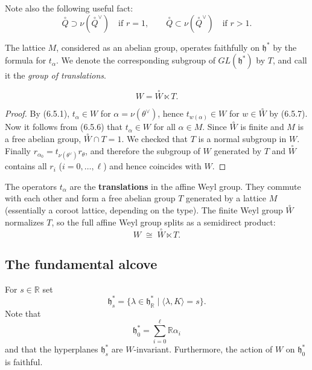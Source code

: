 \documentclass[12pt]{article}
\begin{document}
Note also the following useful fact:
\begin{equation} \label{6.5.9}
    \overset{\circ}{Q} \supset \nu(\overset{\circ}{Q}^\vee) \quad \text{if $r=1$},
    \qquad 
    \overset{\circ}{Q} \subset \nu(\overset{\circ}{Q}^\vee) \quad \text{if $r>1$}.
\end{equation}

The lattice $M$, considered as an abelian group, operates faithfully on $\mathfrak{h}^*$ by the formula for $t_\alpha$. We denote the corresponding subgroup of $GL(\mathfrak{h}^*)$ by $T$, and call it the \emph{group of translations}.

\begin{proposition}[6.5]
\[
    W = \overset{\circ}{W} \ltimes T.
\]
\end{proposition}

\begin{proof}
By (6.5.1), $t_\alpha \in W$ for $\alpha = \nu(\theta^\vee)$, hence 
$t_{w(\alpha)} \in W$ for $w \in \overset{\circ}{W}$ by (6.5.7). Now it follows from (6.5.6) that 
$t_\alpha \in W$ for all $\alpha \in M$. Since $\overset{\circ}{W}$ is finite and $M$ is a free abelian 
group, $\overset{\circ}{W} \cap T = 1$. We checked that $T$ is a normal subgroup in $W$. Finally $r_{\alpha_0} = t_{\nu(\theta^\vee)} r_\theta$, and therefore the subgroup of $W$ 
generated by $T$ and $\overset{\circ}{W}$ contains all $r_i$ ($i=0,\dots,\ell$) and hence coincides 
with $W$.
\end{proof}


\begin{remark}
    The operators $t_\alpha$ are the \textbf{translations} in the affine Weyl group. They commute with each other and form a free abelian group $T$ generated by a lattice $M$ (essentially a coroot lattice, depending on the type). The finite Weyl group $\overset{\circ}{W}$ normalizes $T$, so the full affine Weyl group  splits as a semidirect product:
\[
    W \;\cong\; \overset{\circ}{W} \ltimes T.
\]
\end{remark}

\subsection{The fundamental alcove}
For $s \in \mathbb{R}$ set
\[
    \mathfrak{h}^*_s = \{\lambda \in \mathfrak{h}^*_\mathbb{R} \mid \langle \lambda, K\rangle = s\}.
\]
Note that 
\[
    \mathfrak{h}^*_0 = \sum_{i=0}^\ell \mathbb{R}\alpha_i
\]
and that the hyperplanes $\mathfrak{h}^*_s$ are $W$-invariant. Furthermore, the action of $W$ on $\mathfrak{h}^*_0$ is faithful.
\end{document}
